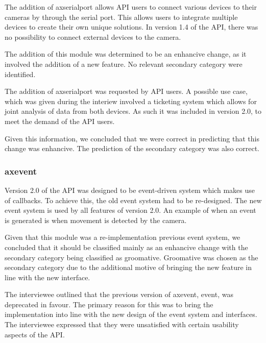 \documentclass{sig-alternate}
\begin{document}
The addition of axserialport allows API users to connect various devices to their cameras by through the serial port. This allows users to integrate multiple devices to create their own unique solutions. In version 1.4 of the API, there was no possibility to connect external devices to the camera.

The addition of this module was determined to be an enhancive change, as it involved the addition of a new feature. No relevant secondary category were identified.

The addition of axserialport was requested by API users. A possible use case, which was given during the interiew involved a ticketing system which allows for joint analysis of data from both devices. As such it was included in version 2.0, to meet the demand of the API users.

Given this information, we concluded that we were correct in predicting that this change was enhancive. The prediction of the secondary category was also correct. 

\subsubsection{axevent}

Version 2.0 of the API was designed to be event-driven system which makes use of callbacks. To achieve this, the old event system had to be re-designed. The new event system is used by all features of version 2.0. An example of when an event is generated is when movement is detected by the camera. 

Given that this module was a re-implementation previous event system, we concluded that it should be classified mainly as an enhancive change with the secondary category being classified as groomative. Groomative was chosen as the secondary category due to the additional motive of bringing the new feature in line with the new interface.

The interviewee outlined that the previous version of axevent, event, was deprecated in favour. The primary reason for this was to bring the implementation into line with the new design of the event system and interfaces. The interviewee expressed that they were unsatisfied with certain usability aspects of the API. 
\end{document}
